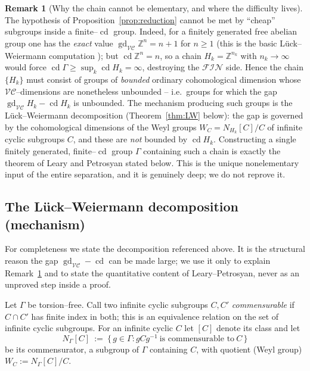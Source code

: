 \documentclass{amsart}
\theoremstyle{definition}
\newtheorem{remark}{Remark}
\newcommand{\Z}{\mathbb{Z}}
\newcommand{\FIN}{\mathcal{F\!I\!N}}
\newcommand{\VC}{\mathcal{V\!C}}
\newcommand{\gd}{\operatorname{gd}}
\newcommand{\cd}{\operatorname{cd}}
\begin{document}
\begin{remark}[Why the chain cannot be elementary, and where the difficulty lives]\label{rem:whyhard}
The hypothesis of Proposition~\ref{prop:reduction} cannot be met by ``cheap'' subgroups inside
a finite--$\cd$ group. Indeed, for a finitely generated free abelian group one has the
\emph{exact} value $\gd_{\VC}\Z^{n}=n+1$ for $n\ge 1$ (this is the basic Lück--Weiermann
computation \cite[\S5, Example 5.6 and the surrounding discussion]{LueckWeiermann}); but
$\cd\Z^{n}=n$, so a chain $H_k=\Z^{n_k}$ with $n_k\to\infty$ would force
$\cd\Gamma\ge\sup_k\cd H_k=\infty$, destroying the $\FIN$ side. Hence the chain $\{H_k\}$ must
consist of groups of \emph{bounded} ordinary cohomological dimension whose $\VC$--dimensions
are nonetheless unbounded -- i.e.\ groups for which the gap $\gd_{\VC}H_k-\cd H_k$ is
unbounded. The mechanism producing such groups is the Lück--Weiermann decomposition
(Theorem~\ref{thm:LW} below): the gap is governed by the cohomological dimensions of the Weyl
groups $W_C=N_{H_k}[C]/C$ of infinite cyclic subgroups $C$, and these are \emph{not} bounded by
$\cd H_k$. Constructing a single finitely generated, finite--$\cd$ group $\Gamma$ containing
such a chain is exactly the theorem of Leary and Petrosyan stated below. This is the unique
nonelementary input of the entire separation, and it is genuinely deep; we do not reprove it.
\end{remark}

\subsection{The Lück--Weiermann decomposition (mechanism)}

For completeness we state the decomposition referenced above. It is the structural reason the
gap $\gd_{\VC}-\cd$ can be made large; we use it only to explain Remark~\ref{rem:whyhard} and to
state the quantitative content of Leary--Petrosyan, never as an unproved step inside a proof.

Let $\Gamma$ be torsion--free. Call two infinite cyclic subgroups $C,C'$ \emph{commensurable}
if $C\cap C'$ has finite index in both; this is an equivalence relation on the set of infinite
cyclic subgroups. For an infinite cyclic $C$ let $[C]$ denote its class and let
\[
N_\Gamma[C]\ :=\ \{\,g\in\Gamma : g C g^{-1}\ \text{is commensurable to}\ C\,\}
\]
be its commensurator, a subgroup of $\Gamma$ containing $C$, with quotient (Weyl group)
$W_C:=N_\Gamma[C]/C$.
\end{document}
